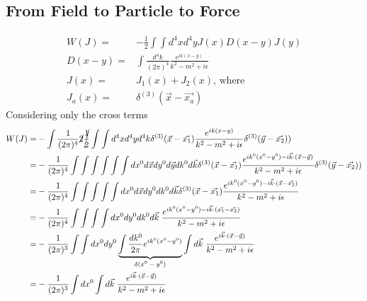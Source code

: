 \documentclass[]{article}
\begin{document}
\subsection{From Field to Particle to Force}
\begin{align*}
	W(J) =& - \frac{1}{2} \int \int d^4x d^4y J(x) D(x-y) J(y)\\
	D(x-y) =& \int \frac{d^4k}{(2\pi)^4} \frac{e^{ik(x-y)}}{k^2-m^2+i\epsilon}\\
	J(x) =& J_1(x) + J_2(x) \text{, where}\\
	J_{a}(x) =&\delta^{(3)}(\vec{x}-\vec{x_a}) 
\end{align*}
Considering only the cross terms
\begin{align*}
	W(J) =& - \int \frac{1}{(2\pi)^4} \cancel{2} \cancel{\frac{1}{2}} \int \int d^4x d^4y d^4k \delta^{(3)}(\vec{x}-\vec{x_1})   \frac{e^{ik(x-y)}}{k^2-m^2+i\epsilon} \delta^{(3)}(\vec{y}-\vec{x_2}))\\
	=& - \frac{1}{(2\pi)^4} \int \int \int \int \int \int dx^0 d\vec{x} dy^0 d\vec{y} dk^0 d\vec{k}  \delta^{(3)}(\vec{x}-\vec{x_1})   \frac{e^{ik^0(x^0-y^0)-i\vec{k} \cdot (\vec{x}-\vec{y})}}{k^2-m^2+i\epsilon} \delta^{(3)}(\vec{y}-\vec{x_2}))\\
	=& - \frac{1}{(2\pi)^4} \int \int \int \int \int dx^0 d\vec{x} dy^0 dk^0 d\vec{k}  \delta^{(3)}(\vec{x}-\vec{x_1})   \frac{e^{ik^0(x^0-y^0)-i\vec{k} \cdot (\vec{x}-\vec{x_2})}}{k^2-m^2+i\epsilon} \\
	=& - \frac{1}{(2\pi)^4} \int \int \int \int dx^0  dy^0 dk^0 d\vec{k} \;    \frac{e^{ik^0(x^0-y^0)-i\vec{k} \cdot (\vec{x_1}-\vec{x_2})}}{k^2-m^2+i\epsilon}\\
	=& - \frac{1}{(2\pi)^3} \int \int dx^0  dy^0 \underbrace{\int \frac{dk^0}{2\pi} e^{ik^0(x^0-y^0)}}_\text{$\delta(x^0-y^0)$} \int d\vec{k} \; \frac{e^{i\vec{k} \cdot (\vec{x}-\vec{y})}}{k^2-m^2+i\epsilon}\\
	=& - \frac{1}{(2\pi)^3} \int  dx^0  \int d\vec{k} \; \frac{e^{i\vec{k} \cdot (\vec{x}-\vec{y})}}{k^2-m^2+i\epsilon}
\end{align*}
\end{document}
